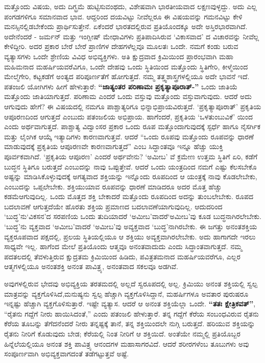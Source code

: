ಮತ್ತೊಂದು ವಿಷಯ, ಅದು ದಿಗ್ಭ್ರಮೆ ಹುಟ್ಟಿಸುವಂಥದು, ವಿಶೇಷವಾಗಿ ಭಾರತೀಯವಾದ ಲಕ್ಷಣವುಳ್ಳದ್ದು. ಅದು ಎಲ್ಲ ಪಂಗಡಗಳಿಗೂ ಸಮಾನವಾದ ಭಾವ. ಆದ್ದರಿಂದ ದಯವಿಟ್ಟು ನೀವೆಲ್ಲರೂ ಈ ವಿಷಯವನ್ನು ಗಮನವಿಟ್ಟು ಕೇಳಿ ಮನಸ್ಸಿನಲ್ಲಿಡಬೇಕೆಂದು ಪ್ರಾರ್ಥಿಸುತ್ತೇನೆ. ಏಕೆಂದರೆ ಭಾರತದಲ್ಲಿರುವ ಪ್ರತಿಯೊಂದಕ್ಕೂ ಅದೇ ಅಸ್ತಿರಭಾರವಾಗಿದೆ. ಅದೇನೆಂದರೆ - ಜರ್ಮನ್​ ಮತ್ತು ಇಂಗ್ಲೀಷ್​ ಮೇಧಾವಿಗಳು ಪ್ರತಿಪಾದಿಸಿರುವ ‘ವಿಕಾಸವಾದ’ ದ ವಿಚಾರವನ್ನು ನೀವೆಲ್ಲ ಕೇಳಿದ್ದೀರಿ. ಅದರ ಪ್ರಕಾರ ಬೇರೆ ಬೇರೆ ಪ್ರಾಣಿಗಳ ದೇಹಗಳೆಲ್ಲವೂ ಮೂಲತಃ ಒಂದೇ. ನಮಗೆ ಕಂಡು ಬರುವ ವ್ಯತ್ಯಾಸಗಳು ಒಂದೇ ಶ್ರೇಣಿಯ ವಿವಿಧ ಅಭಿವ್ಯಕ್ತಿಗಳು. ಅತಿ ಕ್ಷುದ್ರವಾದ ಕ್ರಿಮಿಯಿಂದ ಪ್ರಾರಂಭವಾಗಿ ಮಹಾ ಮಹಿಮನಾದ ಮಹರ್ಷಿಯವರೆವಿಗೂ, ಒಂದೇ ದೇಹವು ಒಂದು ಸ್ಥಿತಿಯಿಂದ ಮತ್ತೊಂದು ಸ್ಥಿತಿಗೇರಿ, ಕೀಳ್ಮೆಯಿಂದ ಮೇಲ್ಮೆಗೇರಿ, ಕಟ್ಟಕಡೆಗೆ ಅಂತ್ಯದ ಪರಿಪೂರ್ಣತೆಗೆ ಹೋಗುತ್ತದೆ. ನಮ್ಮ ತತ್ತ್ವಶಾಸ್ತ್ರಗಳಲ್ಲಿಯೂ ಅದೇ ಭಾವನೆ ಇದೆ. ಪತಂಜಲಿ ಯೋಗಿಗಳು ಹೀಗೆ ಹೇಳುತ್ತಾರೆ: \textbf{“ಜಾತ್ಯಂತರ ಪರಿಣಾಮಃ ಪ್ರಕೃತ್ಯಾಪೂರಾತ್​-”} ಒಂದು ಜಾತಿಯೆ ಮತ್ತೊಂದು ಜಾತಿಯಾಗುತ್ತದೆ. ಪರಿಣಾಮ ಎಂದರೆ ಒಂದು ವಸ್ತುವು ಮತ್ತೊಂದು ವಸ್ತುವಾಗುವುದು. ಆದರೆ ಅದು ಆಗುವುದು ಹೇಗೆ? ಈ ವಿಷಯದಲ್ಲಿ ನಮಗೂ ಪಾಶ್ಚಾತ್ಯರಿಗೂ ಭಿನ್ನಾಭಿಪ್ರಾಯವಿರುತ್ತದೆ. ‘ಪ್ರಕೃತ್ಯಾಪೂರಾತ್​’ ಪ್ರಕೃತಿಯ ಆಪೂರಣದಿಂದ ಆಗುತ್ತದೆ ಎಂಬುದು ಪತಂಜಲಿಯ ಅಭಿಪ್ರಾಯ. ಹಾಗೆಂದರೆ, ಪ್ರಕೃತಿಯ ‘ಒಳತುಂಬುವಿಕೆ’ ಯಿಂದ ಎಂದು ಅರ್ಥವಾಗುತ್ತದೆ. ಪಾಶ್ಚಾತ್ಯ ವಿದ್ವಾಂಸರ ಪ್ರಕಾರ ಒಂದು ರೂಪ ಮತ್ತೊಂದಾಗುವುದಕ್ಕೆ ಸ್ಫರ್ಧೆ ಹಾಗೂ ನೈಸರ್ಗಿಕ ಮತ್ತು ಲೈಂಗಿಕ ಆಯ್ಕೆ ಇತ್ಯಾದಿಗಳು  ಕಾರಣವಾಗುತ್ತವೆ. ಆದರೆ “ಒಂದು ರೂಪವು ಮತ್ತೊಂದು ರೂಪವನ್ನು ಧಾರಣೆ ಮಾಡುವುದಕ್ಕೆ ಪ್ರಕೃತಿಯ ಆಪೂರಣವೇ ಕಾರಣವಾಗುತ್ತದೆ” ಎಂಬ ಸಿದ್ಧಾಂತವೂ ಇನ್ನೂ ಹೆಚ್ಚು ಯುಕ್ತಿ ಪೂರ್ವಕವಾಗಿದೆ. ‘ಪ್ರಕೃತಿಯ ಆಪೂರಣ’ ಎಂದರೆ ಅರ್ಥವೇನು? ‘ಅಮೀಬ’ ವೆ  ಕ್ರಮೇಣ ಉತ್ತಮ ಸ್ಥಿತಿಗೆ ಏರಿ, ಕಡೆಗೆ ಬುದ್ಧನ ಸ್ಥಿತಿಗೂ ಬರುತ್ತದೆ ಎಂಬುದನ್ನು ನಾವು ಒಪ್ಪುತ್ತೇವೆ. ಆದರೆ ಒಂದು ಯಂತ್ರದಿಂದ ನಮಗೆ ಎಷ್ಟು ಕೆಲಸಬೇಕೊ ಅಷ್ಟನ್ನು ಮಾಡಿಸಿಕೊಳ್ಳುವುದಕ್ಕೆ ಅಗತ್ಯವಾದ ಶಕ್ತಿಯನ್ನು ಇನ್ನೊಂದು ರೂಪದಿಂದ ಆ ಯಂತ್ರಕ್ಕೆ ನಾವು ಕೊಡಲೇಬೇಕು, ಎಂಬುದನ್ನು ಒಪ್ಪಲೇಬೇಕು. ಶಕ್ತಿಯು\break ಯಾವ ರೂಪವನ್ನು ಧಾರಣೆ ಮಾಡಿದರೂ ಅದರ ಮೊತ್ತ ಹೆಚ್ಚು ಕಡಮೆ\break ಆಗುವುದಿಲ್ಲ. ಒಂದು ಮೊತ್ತದ ಶಕ್ತಿ ಬೇಕಾದರೆ ಮತ್ತೊಂದು ರೂಪದಿಂದ ಅದನ್ನು ತುಂಬಲೇಬೇಕು. ರೂಪದ ಬದಲಾವಣೆ ಆಗುತ್ತದೆಯೇ ಹೊರತು ಶಕ್ತಿಯ ಪ್ರಮಾಣದ ಬದಲಾವಣೆಯಾಗುವುದಿಲ್ಲ. ಆದುದರಿಂದ ‘ಬುದ್ಧ’ನು\break ‘ವಿಕಸನ’ದ ಸರಪಣಿಯ ಒಂದು ತುದಿಯಾದರೆ ‘ಅಮೀಬ’ವಾದರೆ\break ‘ಅಮೀಬ’ವು ಕೂಡ ಬುದ್ಧನಾಗಿರಲೇಬೇಕು. ‘ಬುದ್ಧ’ನು ವ್ಯಕ್ತವಾದ ‘ಅಮೀಬ’\break ವಾದರೆ ‘ಅಮೀಬ’ವು ಅವ್ಯಕ್ತವಾದ ‘ಬುದ್ಧ’ನಾಗಿರಬೇಕು. ಈ ಜಗತ್ತು ಅನಂತಶಕ್ತಿಯ ವ್ಯಕ್ತರೂಪವಾದ ಪಕ್ಷದಲ್ಲಿ, ಪ್ರಲಯ ಸ್ಥಿತಿಯಲ್ಲಿಯೂ ಆ ಶಕ್ತಿಯು ಅವ್ಯಕ್ತವಾಗಿರಲೇಬೇಕು. ಅದು ಹಾಗಾಗದೇ ಇರಲು ಸಾಧ್ಯವೇ ಇಲ್ಲ. ಹಾಗೆಂದ ಮೇಲೆ ಪ್ರತಿಯೊಂದು ಆತ್ಮವೂ ಅನಂತವಾದುದು ಎಂದು ಸಿದ್ಧಾಂತವಾಗುತ್ತದೆ. ನಮ್ಮ ಪದತಲದಲ್ಲಿ ತೆವಳುತ್ತಿರುವ ಕ್ಷುದ್ರತಮ ಕ್ರಿಮಿಯಿಂದ ಹಿಡಿದು, ಪವಿತ್ರತಮನಾದ ಮಹರ್ಷಿಯವರೆಗೂ, ಎಲ್ಲರ ಆತ್ಮಗಳಲ್ಲಿಯೂ ಅನಂತಶಕ್ತಿ ಅನಂತ ಪಾವಿತ್ರ್ಯ, ಅನಂತವಾದ ಸಕಲವೂ ಅಡಗಿವೆ.

ಅವುಗಳಲ್ಲಿರುವ ಭೇದವು ಅಭಿವ್ಯಕ್ತಿಯ ತರತಮದಲ್ಲಿ ಅಲ್ಲದೆ ಸ್ವರೂಪದಲ್ಲಿ ಅಲ್ಲ. ಕ್ರಿಮಿಯು ಅನಂತ ಶಕ್ತಿಯಲ್ಲಿ ಸ್ವಲ್ಪ ಮಾತ್ರವನ್ನು ವ್ಯಕ್ತಗೊಳಿಸಿದೆ,\break ಮನುಷ್ಯನು ಸ್ವಲ್ಪ ಹೆಚ್ಚಾಗಿ ವ್ಯಕ್ತಗೊಳಿಸಿದ್ದಾನೆ, ಮಹರ್ಷಿಗಳೂ ಅವತಾರ ಪುರುಷರೂ ಇನ್ನಷ್ಟು ಹೆಚ್ಚಾಗಿ ವ್ಯಕ್ತಗೊಳಿಸುತ್ತಾರೆ. ಇಷ್ಟೇ ವ್ಯತ್ಯಾಸ. ಆದರೆ ಆ ಅನಂತ ಶಕ್ತಿಯೆಲ್ಲಾ ಒಂದೇ. \textbf{“ತತಃ ಕ್ಷೇತ್ರಿಕವತ್​”}, “ರೈತನು ಗದ್ದೆಗೆ ನೀರು ಹಾಯಿಸಿದಂತೆ,” ಎಂದು ಪತಂಜಲಿ ಹೇಳುತ್ತಾರೆ. ತನ್ನ ಗದ್ದೆಗೆ ಕೆರೆಯ ಸಂಬಂಧವಿರುವ ರೈತನು ಕೆರೆಯ ತೂಬನ್ನು ತೆಗೆದನೆಂದರೆ ನೀರು ತನ್ನಷ್ಟಕ್ಕೆ ತಾನೆ, ತನ್ನ ಶಕ್ತಿಯಿಂದಲೇ ನುಗ್ಗಿ ಬರುತ್ತದೆ. ಹರಿಯುವ ಶಕ್ತಿಯನ್ನು ರೈತನು ನೀರಿಗೆ ಕೊಡುವುದು ಬೇಡ; ಕೆರೆಯಲ್ಲಿ ನಿಂತ ನೀರಿಗೆ ಆ ಶಕ್ತಿಯಿದೆ. ಅಂತೆಯೇ ನಮ್ಮಲ್ಲಿ ಪ್ರತಿಯೊಬ್ಬರ ಹಿನ್ನೆಲೆಯಲ್ಲಿಯೂ ಅನಂತ ಶಕ್ತಿ ಪಾವಿತ್ರ್ಯ ಆನಂದಗಳ ಮಹಾಸಾಗರವಿದೆ. ಆದರೆ ಶರೀರಗಳೆಂಬ ತೂಬುಗಳು ಅವು ಸಂಪೂರ್ಣವಾಗಿ ಅಭಿವ್ಯಕ್ತವಾಗದಂತೆ ತಡೆಗಟ್ಟುತ್ತವೆ ಅಷ್ಟೆ.

